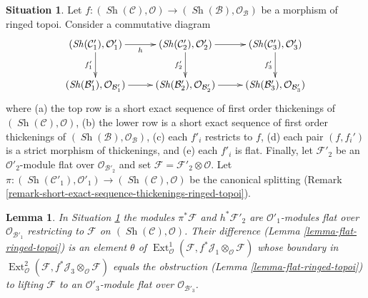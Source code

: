 \documentclass{stacks-project}
\theoremstyle{plain}
\newtheorem{lemma}[subsection]{Lemma}
\theoremstyle{definition}
\newtheorem{situation}[subsection]{Situation}
\theoremstyle{remark}
\numberwithin{equation}{subsection}
\def\Ext{\mathop{\mathrm{Ext}}\nolimits}
\def\Sh{\mathop{\mathit{Sh}}\nolimits}
\begin{document}
\begin{situation}
\label{situation-ses-flat-thickenings-ringed-topoi}
Let $f : (\Sh(\mathcal{C}), \mathcal{O}) \to
(\Sh(\mathcal{B}), \mathcal{O}_\mathcal{B})$ be a morphism of
ringed topoi. Consider a commutative diagram
$$
\xymatrix{
(\Sh(\mathcal{C}'_1), \mathcal{O}'_1) \ar[r]_h \ar[d]_{f'_1} &
(\Sh(\mathcal{C}'_2), \mathcal{O}'_2) \ar[r] \ar[d]_{f'_2} &
(\Sh(\mathcal{C}'_3), \mathcal{O}'_3) \ar[d]_{f'_3} \\
(\Sh(\mathcal{B}'_1), \mathcal{O}_{\mathcal{B}'_1}) \ar[r] &
(\Sh(\mathcal{B}'_2), \mathcal{O}_{\mathcal{B}'_2}) \ar[r] &
(\Sh(\mathcal{B}'_3), \mathcal{O}_{\mathcal{B}'_3})
}
$$
where (a) the top row is a short exact sequence of first order thickenings
of $(\Sh(\mathcal{C}), \mathcal{O})$, (b) the lower row is a short exact
sequence of first order thickenings of
$(\Sh(\mathcal{B}), \mathcal{O}_\mathcal{B})$, (c) each $f'_i$ restricts
to $f$, (d) each pair $(f, f_i')$ is a strict morphism of thickenings, and
(e) each $f'_i$ is flat. Finally, let $\mathcal{F}'_2$ be an
$\mathcal{O}'_2$-module flat over $\mathcal{O}_{\mathcal{B}'_2}$ and
set $\mathcal{F} = \mathcal{F}'_2 \otimes \mathcal{O}$. Let
$\pi : (\Sh(\mathcal{C}'_1), \mathcal{O}'_1) \to
(\Sh(\mathcal{C}), \mathcal{O})$ be the canonical splitting
(Remark \ref{remark-short-exact-sequence-thickenings-ringed-topoi}).
\end{situation}

\begin{lemma}
\label{lemma-verify-iv-ringed-topoi}
In Situation \ref{situation-ses-flat-thickenings-ringed-topoi} the modules
$\pi^*\mathcal{F}$ and $h^*\mathcal{F}'_2$ are $\mathcal{O}'_1$-modules
flat over $\mathcal{O}_{\mathcal{B}'_1}$ restricting to $\mathcal{F}$ on
$(\Sh(\mathcal{C}), \mathcal{O})$.
Their difference (Lemma \ref{lemma-flat-ringed-topoi}) is an element
$\theta$ of
$\Ext^1_\mathcal{O}(\mathcal{F},
f^*\mathcal{J}_1 \otimes_\mathcal{O} \mathcal{F})$
whose boundary in
$\Ext^2_\mathcal{O}(\mathcal{F},
f^*\mathcal{J}_3 \otimes_\mathcal{O} \mathcal{F})$
equals the obstruction (Lemma \ref{lemma-flat-ringed-topoi})
to lifting $\mathcal{F}$ to an $\mathcal{O}'_3$-module flat over
$\mathcal{O}_{\mathcal{B}'_3}$.
\end{lemma}
\end{document}
